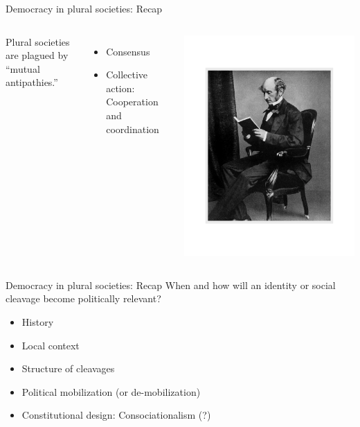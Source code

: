\documentclass[10pt]{beamer}
\begin{document}
\begin{frame}{Democracy in plural societies: Recap}
	\begin{columns}
	Plural societies are plagued by ``mutual antipathies.''
	\vspace{0.2cm}	
	\begin{itemize}
	\item Consensus
	\item Collective action: Cooperation and coordination
	\end{itemize}
    \centering
    \includegraphics[scale=0.42]{Figs/jsm}
    \end{columns}
\end{frame}

\begin{frame}{Democracy in plural societies: Recap}
	When and how will an identity or social cleavage become politically relevant?
	\vspace{0.2cm}
	\begin{itemize}
	\item History
	\item Local context
	\item Structure of cleavages
	\item Political mobilization (or de-mobilization)
	\item Constitutional design: Consociationalism (?)
	\end{itemize}
\end{frame}
\end{document}
